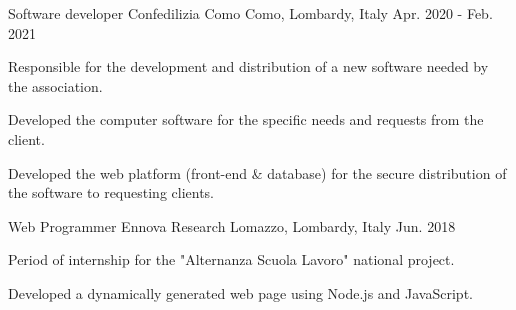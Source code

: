 \begin{cventries}
  \cventry
  {Software developer} %
  {Confedilizia Como} %
  {Como, Lombardy, Italy} %
  {Apr. 2020 - Feb. 2021} %
  {
    \begin{cvitems} %
      \item {Responsible for the development and distribution of a new software needed by the association.}
      \item {Developed the computer software for the specific needs and requests from the client.}
      \item {Developed the web platform (front-end \& database) for the secure distribution of the software to requesting clients.}
    \end{cvitems}
  }

  \cventry
  {Web Programmer} %
  {Ennova Research} %
  {Lomazzo, Lombardy, Italy} %
  {Jun. 2018} %
  {
    \begin{cvitems} %
      \item {Period of internship for the "Alternanza Scuola Lavoro" national project.}
      \item {Developed a dynamically generated web page using Node.js and JavaScript.}
    \end{cvitems}
  }
\end{cventries}
